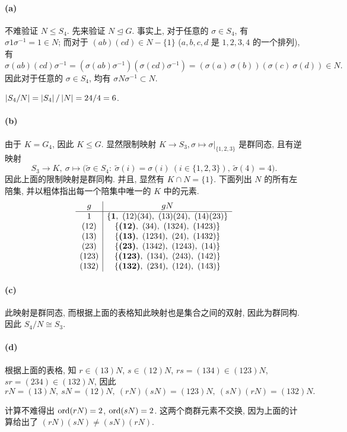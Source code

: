 \documentclass{article}
\begin{document}
\begin{solution}
	\paragraph{(a)} 不难验证 $N \le S_4$. 先来验证 $N \unlhd G$. 事实上, 对于任意的 $\sigma \in S_4$, 有 $\sigma 1 \sigma^{-1} = 1 \in N$; 而对于 $(ab)(cd) \in N-\{1\}$ ($a,b,c,d$ 是 $1,2,3,4$ 的一个排列), 有
	\[ \sigma (ab)(cd) \sigma^{-1} = (\sigma (ab) \sigma^{-1}) (\sigma (cd) \sigma^{-1}) = (\sigma(a)\ \sigma(b))(\sigma(c)\ \sigma(d)) \in N. \]
	因此对于任意的 $\sigma \in S_4$, 均有 $\sigma N \sigma^{-1} \subset N$. 

	$\left|S_4/N\right| = \left|S_4\right| / \left|N\right| = 24/4 = 6$.

	\paragraph{(b)} 由于 $K = G_{4}$, 因此 $K \le G$. 显然限制映射 $K \to S_3, \sigma \mapsto \sigma \big|_{\{1,2,3\}}$ 是群同态, 且有逆映射
	\[ S_3 \to K, \ \sigma \mapsto \Big( \tilde{\sigma} \in S_4:\ \tilde{\sigma}(i) = \sigma(i)\ (i \in \{1,2,3\}),\ \tilde{\sigma}(4) = 4 \Big). \]
	因此上面的限制映射是群同构. 并且, 显然有 $K \cap N = \{1\}$. 下面列出 $N$ 的所有左陪集, 并以粗体指出每一个陪集中唯一的 $K$ 中的元素.
	\[ \begin{array}{c|c}
		g & gN \\ \hline
		1 & \{\boldsymbol{1},\ (12)(34),\ (13)(24),\ (14)(23)\} \\
		(12) & \{\boldsymbol{(12)},\ (34),\ (1324),\ (1423)\} \\
		(13) & \{\boldsymbol{(13)},\ (1234),\ (24),\ (1432)\} \\
		(23) & \{\boldsymbol{(23)},\ (1342),\ (1243),\ (14)\} \\
		(123) & \{\boldsymbol{(123)},\ (134),\ (243),\ (142)\} \\
		(132) & \{\boldsymbol{(132)},\ (234),\ (124),\ (143)\}
	\end{array} \]

	\paragraph{(c)} 此映射是群同态, 而根据上面的表格知此映射也是集合之间的双射, 因此为群同构. 因此 $S_4 / N \cong S_3$. 

	\paragraph{(d)} 根据上面的表格, 知 $r \in (13)N$, $s \in (12)N$, $rs = (134) \in (123)N$, $sr = (234) \in (132)N$, 因此
	\[ rN = (13)N,\ sN = (12)N,\ (rN)(sN) = (123)N,\ (sN)(rN) = (132)N. \]

	计算不难得出 $\operatorname{ord}(rN) = 2$, $\operatorname{ord}(sN) = 2$. 这两个商群元素不交换, 因为上面的计算给出了 $(rN)(sN) \neq (sN)(rN)$.
\end{solution}
\end{document}
